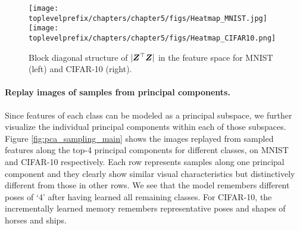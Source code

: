 \documentclass[../../book-main.tex]{subfiles}
\begin{document}
\begin{figure}[tb]
\centering
\texttt{[image: \\toplevelprefix/chapters/chapter5/figs/Heatmap\_MNIST.jpg]}  
\texttt{[image: \\toplevelprefix/chapters/chapter5/figs/Heatmap\_CIFAR10.png]}
\caption{\small Block diagonal structure of $|\bm{Z}^\top \bm{Z}|$ in the feature space for MNIST (left) and CIFAR-10 (right).}
\label{fig:cifar_10_pca_sampling_main}
\end{figure}



\paragraph{Replay images of samples from principal components.}
Since features of each class can be modeled as a principal subspace, we further visualize the individual principal components within each of those subspaces. Figure \ref{fig:pca_sampling_main} shows the images replayed from sampled features along the top-4 principal components for different classes, on MNIST and CIFAR-10 respectively. Each row represents samples along one principal component and they clearly show similar visual characteristics but distinctively different from those in other rows. We see that the model remembers different poses of `4' after having learned all remaining classes. For CIFAR-10, the incrementally learned memory remembers representative poses and shapes of horses and ships. 
\end{document}
